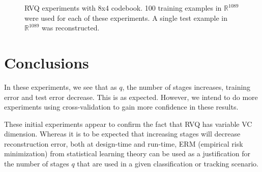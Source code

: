 \begin{figure}
\caption{RVQ experiments with 8x4 codebook. 100 training examples in $\mathbb{R}^{1089}$ were used for each of these experiments.  A single test example in $\mathbb{R}^{1089}$ was reconstructed.}
\label{fig:RVQ_results}
\end{figure}

\section{Conclusions}
In these experiments, we see that as $q$, the number of stages increases, training error and test error decrease.  This is as expected.  However, we intend to do more experiments using cross-validation to gain more confidence in these results.

These initial experiments appear to confirm the fact that RVQ has variable VC dimension.  Whereas it is to be expected that increasing stages will decrease reconstruction error, both at design-time and run-time, ERM (empirical risk minimization) from statistical learning theory can be used as a justification for the number of stages $q$ that are used in a given classification or tracking scenario.


\clearpage
\newpage
\normalsize


